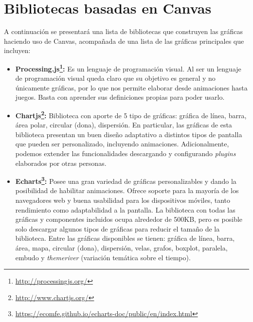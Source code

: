 \section{Bibliotecas basadas en Canvas}
A continuación se presentará una lista de bibliotecas que construyen las gráficas haciendo uso de Canvas, acompañada de una lista de las gráficas principales que incluyen:
\\[10pt]
\begin{itemize}
\item\textbf{Processing.js\footnote{\url{http://processingjs.org/}}:}
Es un lenguaje de programación visual. Al ser un lenguaje de programación visual queda claro que su objetivo es general y no únicamente gráficas, por lo que nos permite elaborar desde animaciones hasta juegos. Basta con aprender sus definiciones propias para poder usarlo.
\item\textbf{Chartjs\footnote{\url{http://www.chartjs.org/}}:}
Biblioteca con aporte de 5 tipo de gráficas: gráfica de línea, barra, área polar, circular (dona), dispersión. En particular, las gráficas de esta biblioteca presentan un buen diseño adaptativo a distintos tipos de pantalla que pueden ser personalizado, incluyendo animaciones. Adicionalmente, podemos extender las funcionalidades descargando y configurando \textit{plugins} elaborados por otras personas.
\item\textbf{Echarts\footnote{\url{https://ecomfe.github.io/echarts-doc/public/en/index.html}}:}
Posee una gran variedad de gráficas personalizables y dando la posibilidad de habilitar animaciones. Ofrece soporte para la mayoría de los navegadores web y buena usabilidad para los dispositivos móviles, tanto rendimiento como adaptabilidad a la pantalla. La biblioteca con todas las gráficas y componentes incluidos ocupa alrededor de 500KB, pero es posible solo descargar algunos tipos de gráficas para reducir el tamaño de la biblioteca. Entre las gráficas disponibles se tienen: gráfica de línea, barra, área, mapa, circular (dona), dispersión, velas, grafos, boxplot, paralela, embudo y \textit{themeriver} (variación temática sobre el tiempo).
\\[15pt]
\end{itemize}
